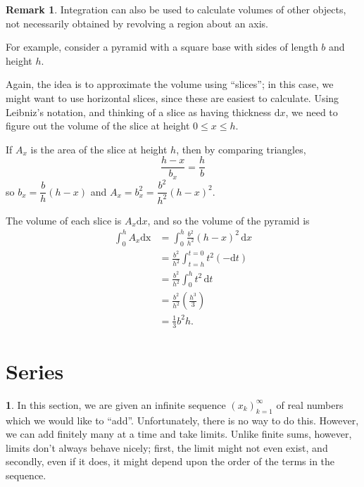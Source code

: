 \documentclass[11pt]{article}
\theoremstyle{definition}
\newtheorem{remark}[thm]{Remark}
\newtheorem{none}[thm]{}
\begin{document}
\begin{remark}
Integration can also be used to calculate volumes of other objects, not necessarily obtained by revolving a region about an axis. 

For example, consider a pyramid with a square base with sides of length $b$ and height $h$. 

Again, the idea is to approximate the volume using ``slices''; in this case, we might want to use horizontal slices, since these are easiest to calculate. Using Leibniz's notation, and thinking of a slice as having thickness $\mathrm{d}x$, we need to figure out the volume of the slice at height $0 \leq x \leq h$. 

If $A_x$ is the area of the slice at height $h$, then by comparing triangles,
$$\frac{h-x}{b_x} = \frac{h}{b}$$
so $b_x = \dfrac{b}{h}(h-x)$ and $A_x = b_x^2 = \dfrac{b^2}{h^2}(h-x)^2$. 

The volume of each slice is $A_x\mathrm{d}x$, and so the volume of the pyramid is 
\begin{align*}
\int_0^h A_x \mathrm{dx}
& = \int_0^h \frac{b^2}{h^2}(h-x)^2 \, \mathrm{d}x \\
& = \frac{b^2}{h^2} \int_{t=h}^{t=0} t^2 (-\mathrm{d}t) \\
& = \frac{b^2}{h^2} \int_0^h t^2 \, \mathrm{d}t \\
& = \frac{b^2}{h^2} \left(\frac{h^3}3\right) \\
& = \frac13 b^2h \text{.}
\end{align*}
\end{remark}

\newpage

\section{Series}

\begin{none}
In this section, we are given an infinite sequence $(x_k)_{k=1}^\infty$ of real numbers which we would like to ``add''. Unfortunately, there is no way to do this. However, we can add finitely many at a time and take limits. Unlike finite sums, however, limits don't always behave nicely; first, the limit might not even exist, and secondly, even if it does, it might depend upon the order of the terms in the sequence.
\end{none}
\end{document}
